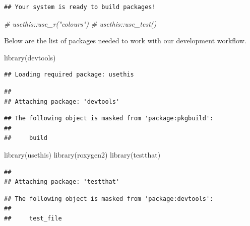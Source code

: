 \documentclass[
]{book}
\newenvironment{Shaded}{\begin{snugshade}}{\end{snugshade}}
\newcommand{\CommentTok}[1]{\textcolor[rgb]{0.56,0.35,0.01}{\textit{#1}}}
\newcommand{\FunctionTok}[1]{\textcolor[rgb]{0.00,0.00,0.00}{#1}}
\newcommand{\NormalTok}[1]{#1}
\newcommand{\StringTok}[1]{\textcolor[rgb]{0.31,0.60,0.02}{#1}}
\begin{document}
\begin{verbatim}
## Your system is ready to build packages!
\end{verbatim}

\begin{Shaded}
\begin{Highlighting}[]
\CommentTok{\# usethis::use\_r("colours")}
\CommentTok{\# usethis::use\_test()}
\end{Highlighting}
\end{Shaded}

Below are the list of packages needed to work with our development workflow.

\begin{Shaded}
\begin{Highlighting}[]
\FunctionTok{library}\NormalTok{(}\StringTok{\textquotesingle{}devtools\textquotesingle{}}\NormalTok{)}
\end{Highlighting}
\end{Shaded}

\begin{verbatim}
## Loading required package: usethis
\end{verbatim}

\begin{verbatim}
## 
## Attaching package: 'devtools'
\end{verbatim}

\begin{verbatim}
## The following object is masked from 'package:pkgbuild':
## 
##     build
\end{verbatim}

\begin{Shaded}
\begin{Highlighting}[]
\FunctionTok{library}\NormalTok{(}\StringTok{\textquotesingle{}usethis\textquotesingle{}}\NormalTok{)}
\FunctionTok{library}\NormalTok{(}\StringTok{\textquotesingle{}roxygen2\textquotesingle{}}\NormalTok{)}
\FunctionTok{library}\NormalTok{(}\StringTok{\textquotesingle{}testthat\textquotesingle{}}\NormalTok{)}
\end{Highlighting}
\end{Shaded}

\begin{verbatim}
## 
## Attaching package: 'testthat'
\end{verbatim}

\begin{verbatim}
## The following object is masked from 'package:devtools':
## 
##     test_file
\end{verbatim}
\end{document}
